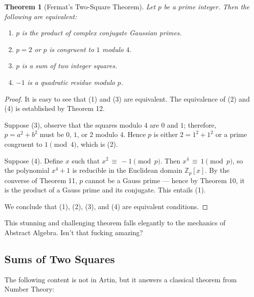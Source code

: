 \documentclass[11pt]{article}
\newtheorem{theorem}{Theorem}
\begin{document}
\begin{adjustwidth}{0.5cm}{}
  \begin{theorem}[Fermat's Two-Square Theorem]
    Let $p$ be a prime integer. Then the following are equivalent:
    \begin{enumerate}
      \item $p$ is the product of complex conjugate Gaussian primes.
      \item $p = 2$ or $p$ is congruent to $1$ modulo $4$.
      \item $p$ is a sum of two integer squares.
      \item $-1$ is a quadratic residue modulo $p$.
    \end{enumerate}
  \end{theorem}
  \begin{proof}
    It is easy to see that (1) and (3) are equivalent. The equivalence of (2) and (4) is established by Theorem 12.

    Suppose (3), observe that the squares modulo $4$ are $0$ and $1$; therefore, $p = a^{2} + b^{2}$ must be $0$, $1$, or $2$ modulo $4$. Hence $p$ is either $2 = 1^{2} + 1^{2}$ or a prime congruent to $1 \pmod{4}$, which is (2).

    Suppose (4). Define $x$ such that $x^{2} \, \equiv \, -1 \pmod{p}$. Then $x^{4} \, \equiv \, 1 \pmod{p}$, so the polynomial $x^{4} + 1$ is reducible in the Euclidean domain $\mathbb{Z}_{p}[x]$. By the converse of Theorem 11, $p$ cannot be a Gauss prime --- hence by Theorem 10, it is the product of a Gauss prime and its conjugate. This entails (1).

    We conclude that (1), (2), (3), and (4) are equivalent conditions.
  \end{proof}
\end{adjustwidth}

This stunning and challenging theorem falls elegantly to the mechanics of Abstract Algebra. Isn't that fucking amazing?


\subsection{Sums of Two Squares}

The following content is not in Artin, but it answers a classical theorem from Number Theory:
\end{document}
